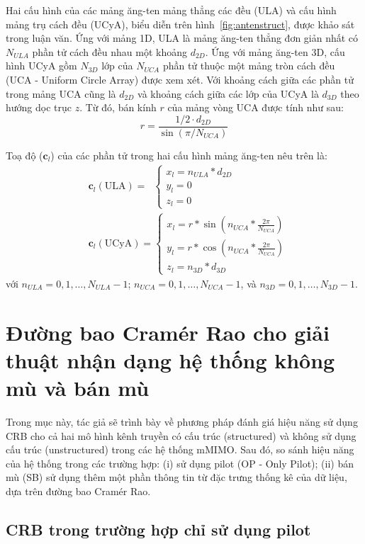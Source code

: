 Hai cấu hình của các mảng ăng-ten mảng thẳng các đều (ULA) và cấu hình mảng trụ cách đều (UCyA), biểu diễn trên hình~\ref{fig:antenstruct}, được khảo sát trong luận văn. Ứng với mảng 1D, ULA là mảng ăng-ten thẳng đơn giản nhất có $N_{ULA}$ phần tử cách đều nhau một khoảng $d_{2D}$. Ứng với mảng ăng-ten 3D, cấu hình UCyA gồm $N_{3D}$ lớp của $N_{UCA}$ phần tử thuộc một mảng tròn cách đều (UCA - Uniform Circle Array) được xem xét. Với khoảng cách giữa các phần tử trong mảng UCA cũng là $d_{2D}$ và khoảng cách giữa các lớp của UCyA là $d_{3D}$ theo hướng dọc trục $z$. Từ đó, bán kính $r$ của mảng vòng UCA được tính như sau:
\begin{equation}
    r = \frac{1/2 \cdot d_{2D}}{\sin(\pi/N_{UCA})}
\end{equation}

Toạ độ ($\boldsymbol{c}_l$) của các phần tử trong hai cấu hình mảng ăng-ten nêu trên là:
\begin{align} 
    &\boldsymbol{c}_l(\text{ULA}) = \;\; \begin{cases}
    x_l = n_{ULA} * d_{2D}\\ 
    y_l = 0\\ 
    z_l = 0
    \end{cases}
    \\
    &\boldsymbol{c}_l(\text{UCyA}) = \begin{cases}
    x_l = r * \sin(n_{UCA} * \frac{2\pi}{N_{UCA}})\\ 
    y_l = r * \cos(n_{UCA} * \frac{2\pi}{N_{UCA}})\\ 
    z_l = n_{3D} * d_{3D}
    \end{cases}
\end{align}
với $n_{ULA} = 0, 1, \ldots, N_{ULA}-1$; $n_{UCA} = 0, 1, \ldots, N_{UCA}-1$, và $n_{3D} = 0, 1, \ldots, N_{3D}-1$.


\section{Đường bao Cramér Rao cho giải thuật nhận dạng hệ thống không mù và bán mù}\label{CRB}

Trong mục này, tác giả sẽ trình bày về phương pháp đánh giá hiệu năng sử dụng CRB cho cả hai mô hình kênh truyền có cấu trúc (structured) và không sử dụng cấu trúc (unstructured) trong các hệ thống mMIMO. Sau đó, so sánh hiệu năng của hệ thống trong các trường hợp: (i) sử dụng pilot (OP - Only Pilot); (ii) bán mù (SB) sử dụng thêm một phần thông tin từ đặc trưng thống kê của dữ liệu, dựa trên đường bao Cramér Rao. 
\subsection{CRB trong trường hợp chỉ sử dụng pilot}


